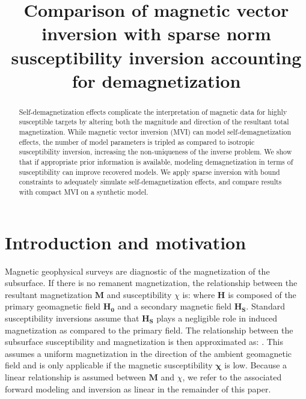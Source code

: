 \documentclass{segabs}
\begin{document}
\title{Comparison of magnetic vector inversion with sparse norm susceptibility inversion accounting for demagnetization}



\maketitle

\begin{abstract}

Self-demagnetization effects complicate the interpretation of magnetic data for highly susceptible targets by altering both the magnitude and direction of the resultant total magnetization. While magnetic vector inversion (MVI) can model self-demagnetization effects, the number of model parameters is tripled as compared to isotropic susceptibility inversion, increasing the non-uniqueness of the inverse problem. We show that if appropriate prior information is available, modeling demagnetization in terms of susceptibility can improve recovered models.  We apply sparse inversion with bound constraints to adequately simulate self-demagnetization effects, and compare results with compact MVI on a synthetic model.

\end{abstract}

\section{Introduction and motivation}

Magnetic geophysical surveys are diagnostic of the magnetization of the subsurface. If there is no remanent magnetization, the relationship between the resultant magnetization $\mathbf{M}$ and susceptibility $\chi$ is: where $\mathbf{H}$ is composed of the primary geomagnetic field $\mathbf{H_0}$ and a secondary magnetic field $\mathbf{H_S}$. Standard susceptibility inversions assume that $\mathbf{H_S}$ plays a negligible role in induced magnetization as compared to the primary field. The relationship between the subsurface susceptibility and magnetization is then approximated as: \citep{Li1996}. This assumes a uniform magnetization in the direction of the ambient geomagnetic field and is only applicable if the magnetic susceptibility $\mathbf{\chi}$ is low. Because a linear relationship is assumed between $\mathbf{M}$ and $\chi$, we refer to the associated forward modeling and inversion as linear in the remainder of this paper.
\end{document}
